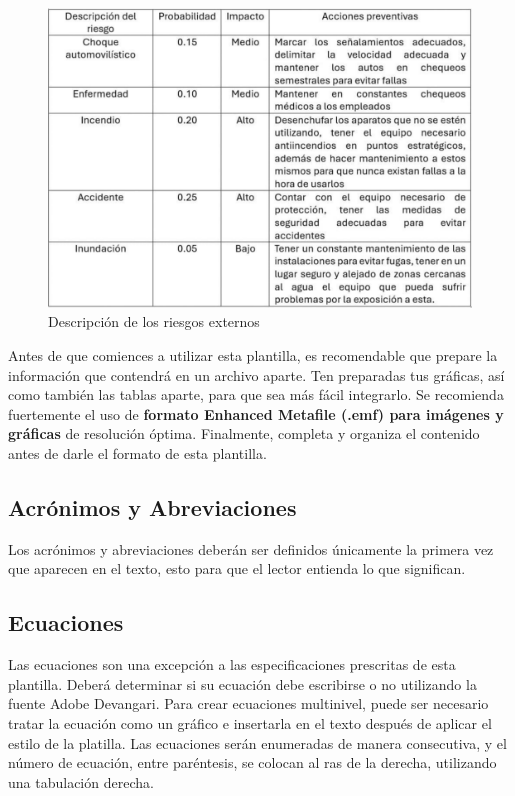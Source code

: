     \begin{figure}[H]
        \centering
        \includegraphics[trim = {1mm 1mm 1mm 1mm},clip,scale=0.3]{8/Img/Riesgos.pdf}
        \caption{Descripción de los riesgos externos}
        \label{Riesgos externos}
    \end{figure}
    Antes de que comiences a utilizar esta plantilla, es recomendable que prepare la información que contendrá en un archivo aparte. 
    Ten preparadas tus gráficas, así como también las tablas aparte, para que sea más fácil integrarlo. 
    Se recomienda fuertemente el uso de \textbf{formato Enhanced Metafile (.emf) para imágenes y gráficas} de resolución óptima. 
    Finalmente, completa y organiza el contenido antes de darle el formato de esta plantilla. 
    
    \subsection{Acrónimos y Abreviaciones}
    
    Los acrónimos y abreviaciones deberán ser definidos únicamente la primera vez que aparecen en el texto, esto para que el lector entienda lo que significan.
    
    \subsection{Ecuaciones}
    
    Las ecuaciones son una excepción a las especificaciones prescritas de esta plantilla. 
    Deberá determinar si su ecuación debe escribirse o no utilizando la fuente Adobe Devangari. 
    Para crear ecuaciones multinivel, puede ser necesario tratar la ecuación como un gráfico e insertarla en el texto después de aplicar el estilo de la platilla.
    Las ecuaciones serán enumeradas de manera consecutiva, y el número de ecuación, entre paréntesis, se colocan al ras de la derecha, utilizando una tabulación derecha. 
    
